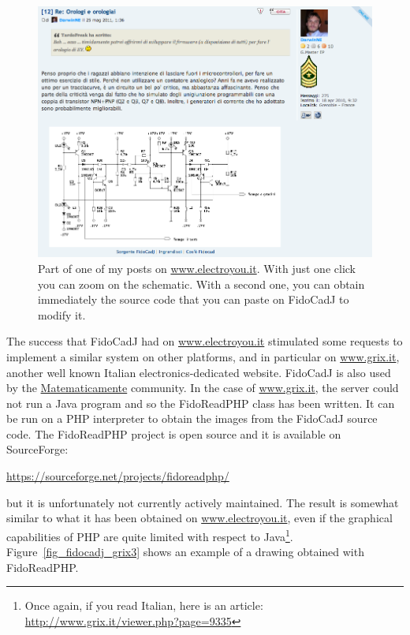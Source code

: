 \documentclass[10pt,a4paper,twoside]{scrreprt}
\begin{document}
\begin{figure}
 \includegraphics[width=\textwidth]{discussione_electroyou.png}
 \caption{Part of one of my posts on \href{http://www.electroyou.it}{www.electroyou.it}.
 With just one click you can zoom on the schematic. With a second one, you can obtain immediately the source code that you can paste on FidoCadJ to modify it.}
\label{fig_discussione_electroyou}
\end{figure}

The success that FidoCadJ had on \href{http://www.electroyou.it}{www.electroyou.it} stimulated some requests to implement a similar system on other platforms, and in particular on \href{http://www.grix.it}{www.grix.it}, another well known Italian electronics-dedicated website. FidoCadJ is also used by the \href{http://www.matematicamente.it/forum/viewtopic.php?f=38&t=121249}{Matematicamente} community.
In the case of \href{http://www.grix.it}{www.grix.it}, the server could not run a Java program and so the FidoReadPHP class has been written. It can be run on a PHP interpreter to obtain the images from the FidoCadJ source code.
The FidoReadPHP project is open source and it is available on SourceForge:

\href{https://sourceforge.net/projects/fidoreadphp/}{https://sourceforge.net/projects/fidoreadphp/}

but it is unfortunately not currently actively maintained. The result is somewhat similar to what it has been obtained on \href{http://www.electroyou.it}{www.electroyou.it}, even if the graphical capabilities of PHP are quite limited with respect to Java\footnote{Once again, if you read Italian, here is an article:\\
\href{http://www.grix.it/viewer.php?page=9335}{http://www.grix.it/viewer.php?page=9335}}.
Figure~\ref{fig_fidocadj_grix3} shows an example of a drawing obtained with FidoReadPHP.
\end{document}
